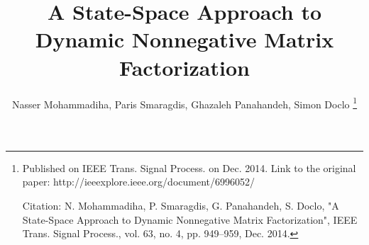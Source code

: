\documentclass[10pt,twocolumn,twoside] {IEEEtran}
\begin{document}

\title{A State-Space Approach to Dynamic Nonnegative Matrix Factorization}

\author{Nasser Mohammadiha, Paris Smaragdis, Ghazaleh Panahandeh, Simon Doclo
\thanks{
Published on IEEE Trans. Signal Process. on Dec. 2014. Link to the original paper: http://ieeexplore.ieee.org/document/6996052/

Citation: N. Mohammadiha, P. Smaragdis, G. Panahandeh, S. Doclo, "A State-Space Approach to Dynamic Nonnegative Matrix Factorization", IEEE Trans. Signal Process., vol. 63, no. 4, pp. 949--959, Dec. 2014.}}
%




\maketitle
\end{document}
